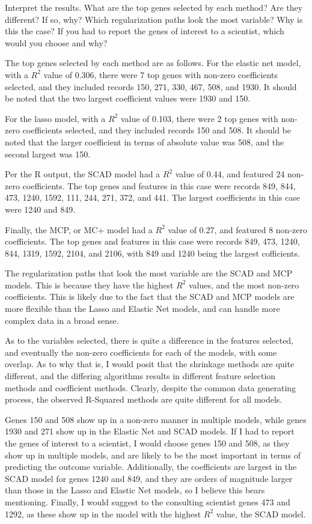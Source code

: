 \documentclass[12pt, letterpaper]{article}
\begin{document}
Interpret the results. What are the top genes selected by each method? Are they different? If so, why? Which regularization paths look the most variable? Why is this the case? If you had to report 
the genes of interest to a scientist, which would you choose and why? 

The top genes selected by each method are as follows. For the elastic net model, with a $R^2$ value of 0.306, there were 7 top genes with non-zero coefficients selected, and they included records 150, 271, 330, 467, 508, and 1930. It should be noted that the two largest coefficient values were 1930 and 150. 

For the lasso model, with a $R^2$ value of 0.103, there were 2 top genes with non-zero coefficients selected, and they included records 150 and 508. It should be noted that the larger coefficient in terms of absolute value was 508, and the second largest was 150. 

Per the R output, the SCAD model had a $R^2$ value of 0.44, and featured 24 non-zero coefficients. The top genes and features in this case were records 849, 844, 473, 1240, 1592, 111, 244, 271, 372, and 441. The largest coefficients in this case were 1240 and 849. 

Finally, the MCP, or MC+ model had a $R^2$ value of 0.27, and featured 8 non-zero coefficients. The top genes and features in this case were records 849, 473, 1240, 844, 1319, 1592, 2104, and 2106, with 849 and 1240 being the largest cofficients. 

The regularization paths that look the most variable are the SCAD and MCP models. This is because they have the highest $R^2$ values, and the most non-zero coefficients. This is likely due to the fact that the SCAD and MCP models are more flexible than the Lasso and Elastic Net models, and can handle more complex data in a broad sense. 

As to the variables selected, there is quite a difference in the features selected, and eventually the non-zero coefficients for each of the models, with some overlap. As to why that is, I would posit that the shrinkage methods are quite different, and the differing algorithms results in different feature selection methods and coefficient methods. Clearly, despite the common data generating process, the observed R-Squared methods are quite different for all models. 

Genes 150 and 508 show up in a non-zero manner in multiple models, while genes 1930 and 271 show up in the Elastic Net and SCAD models. If I had to report the genes of interest to a scientist, I would choose genes 150 and 508, as they show up in multiple models, and are likely to be the most important in terms of predicting the outcome variable. Additionally, the coefficients are largest in the SCAD model for genes 1240 and 849, and they are orders of magnitude larger than those in the Lasso and Elastic Net models, so I believe this bears mentioning. Finally, I would suggest to the consulting scientist genes 473 and 1292, as these show up in the model with the highest $R^2$ value, the SCAD model. 
\end{document}
